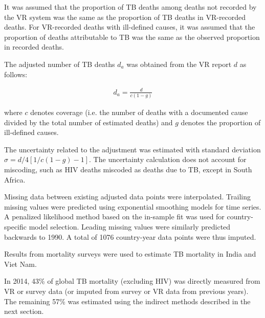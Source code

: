 It was assumed that the proportion of TB deaths among deaths not recorded by the VR system was the same as the proportion of TB deaths in VR-recorded deaths. For VR-recorded deaths with ill-defined causes, it was assumed that the proportion of deaths attributable to TB was the same as the observed proportion in recorded deaths. 

The adjusted number of TB deaths $d_a$ was obtained from the VR report $d$ as follows:

\begin{align*}
d_a = \frac{d}{c(1-g)}
\end{align*}

where $c$ denotes coverage (i.e. the number of deaths with a documented cause divided by the total number of estimated deaths) and $g$ denotes the proportion of ill-defined causes.

The uncertainty related to the adjustment was estimated with standard deviation $\hat{\sigma} = d/4 [1/c(1-g) -1]$. The uncertainty calculation does not account for miscoding, such as HIV deaths miscoded as deaths due to TB, except in South Africa. 

Missing data between existing adjusted data points were interpolated. Trailing missing values were predicted using exponential smoothing models for time series. A penalized likelihood method based on the in-sample fit was used for country-specific model selection. Leading missing values were similarly predicted backwards to 1990. A total of 1076 country-year data points were thus imputed.

Results from mortality surveys were used to estimate TB mortality in India and Viet Nam. 

In 2014, 43\% of global TB mortality (excluding HIV) was directly measured from VR or survey data (or imputed from survey or VR data from previous years). The remaining 57\% was estimated using the indirect methods described in the next section.




